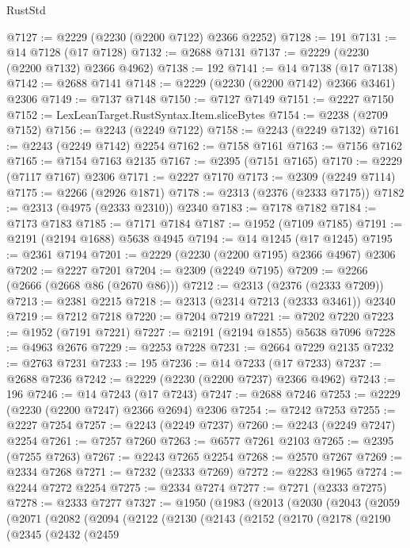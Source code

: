 \begin{lexlean}{RustStd}
\begin{coremodule}
@7127 := @2229 (@2230 (@2200 @7122) @2366 @2252)
@7128 := 191
@7131 := @14 @7128 (@17 @7128)
@7132 := @2688 @7131
@7137 := @2229 (@2230 (@2200 @7132) @2366 @4962)
@7138 := 192
@7141 := @14 @7138 (@17 @7138)
@7142 := @2688 @7141
@7148 := @2229 (@2230 (@2200 @7142) @2366 @3461) @2306
@7149 := @7137 @7148
@7150 := @7127 @7149
@7151 := @2227 @7150
@7152 := LexLeanTarget.RustSyntax.Item.sliceBytes
@7154 := @2238 (@2709 @7152)
@7156 := @2243 (@2249 @7122)
@7158 := @2243 (@2249 @7132)
@7161 := @2243 (@2249 @7142) @2254
@7162 := @7158 @7161
@7163 := @7156 @7162
@7165 := @7154 @7163 @2135
@7167 := @2395 (@7151 @7165)
@7170 := @2229 (@7117 @7167) @2306
@7171 := @2227 @7170
@7173 := @2309 (@2249 @7114)
@7175 := @2266 (@2926 @1871)
@7178 := @2313 (@2376 (@2333 @7175))
@7182 := @2313 (@4975 (@2333 @2310)) @2340
@7183 := @7178 @7182
@7184 := @7173 @7183
@7185 := @7171 @7184
@7187 := @1952 (@7109 @7185)
@7191 := @2191 (@2194 @1688) @5638 @4945
@7194 := @14 @1245 (@17 @1245)
@7195 := @2361 @7194
@7201 := @2229 (@2230 (@2200 @7195) @2366 @4967) @2306
@7202 := @2227 @7201
@7204 := @2309 (@2249 @7195)
@7209 := @2266 (@2666 (@2668 @86 (@2670 @86)))
@7212 := @2313 (@2376 (@2333 @7209))
@7213 := @2381 @2215
@7218 := @2313 (@2314 @7213 (@2333 @3461)) @2340
@7219 := @7212 @7218
@7220 := @7204 @7219
@7221 := @7202 @7220
@7223 := @1952 (@7191 @7221)
@7227 := @2191 (@2194 @1855) @5638 @7096
@7228 := @4963 @2676
@7229 := @2253 @7228
@7231 := @2664 @7229 @2135
@7232 := @2763 @7231
@7233 := 195
@7236 := @14 @7233 (@17 @7233)
@7237 := @2688 @7236
@7242 := @2229 (@2230 (@2200 @7237) @2366 @4962)
@7243 := 196
@7246 := @14 @7243 (@17 @7243)
@7247 := @2688 @7246
@7253 := @2229 (@2230 (@2200 @7247) @2366 @2694) @2306
@7254 := @7242 @7253
@7255 := @2227 @7254
@7257 := @2243 (@2249 @7237)
@7260 := @2243 (@2249 @7247) @2254
@7261 := @7257 @7260
@7263 := @6577 @7261 @2103
@7265 := @2395 (@7255 @7263)
@7267 := @2243 @7265 @2254
@7268 := @2570 @7267
@7269 := @2334 @7268
@7271 := @7232 (@2333 @7269)
@7272 := @2283 @1965
@7274 := @2244 @7272 @2254
@7275 := @2334 @7274
@7277 := @7271 (@2333 @7275)
@7278 := @2333 @7277
@7327 := @1950
    (@1983
      (@2013
        (@2030
          (@2043
            (@2059
              (@2071
                (@2082
                  (@2094
                    (@2122
                      (@2130
                        (@2143
                          (@2152
                            (@2170
                              (@2178
                                (@2190
                                  (@2345
                                    (@2432
                                      (@2459

\end{coremodule}
\end{lexlean}
